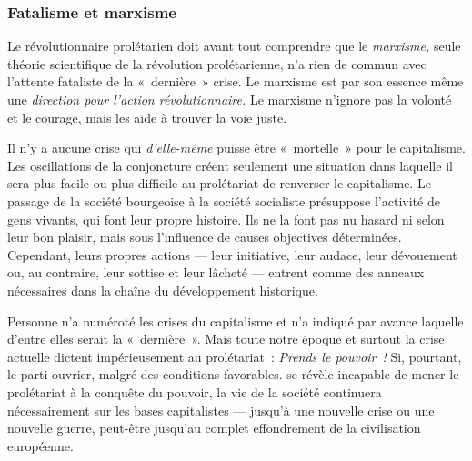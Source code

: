 \documentclass[french,twoside]{book} %
\begin{document}
 \subsubsection[{Fatalisme et marxisme}]{Fatalisme et marxisme}
\noindent Le révolutionnaire prolétarien doit avant tout comprendre que le \emph{marxisme,} seule théorie scientifique de la révolution prolétarienne, n’a rien de commun avec l’attente fataliste de la « dernière » crise. Le marxisme est par son essence même une \emph{direction pour l’action révolutionnaire. }Le marxisme n’ignore pas la volonté et le courage, mais les aide à trouver la voie juste.\par
Il n’y a aucune crise qui \emph{d’elle-même} puisse être « mortelle » pour le capitalisme. Les oscillations de la conjoncture créent seulement une situation dans laquelle il sera plus facile ou plus difficile au prolétariat de renverser le capitalisme. Le passage de la société bourgeoise à la société socialiste présuppose l’activité de gens vivants, qui font leur propre histoire. Ils ne la font pas nu hasard ni selon leur bon plaisir, mais sous l’influence de causes objectives déterminées. Cependant, leurs propres actions — leur initiative, leur audace, leur dévouement ou, au contraire, leur sottise et leur lâcheté — entrent comme des anneaux nécessaires dans la chaîne du développement historique.\par
Personne n’a numéroté les crises du capitalisme et n’a indiqué par avance laquelle d’entre elles serait la « dernière ». Mais toute notre époque et surtout la crise actuelle dictent impérieusement au prolétariat : \emph{Prends le pouvoir !} Si, pourtant, le parti ouvrier, malgré des conditions favorables. se révèle incapable de mener le prolétariat à la conquête du pouvoir, la vie de la société continuera nécessairement sur les bases capitalistes — jusqu’à une nouvelle crise ou une nouvelle guerre, peut-être jusqu’au complet effondrement de la civilisation européenne.
\end{document}
